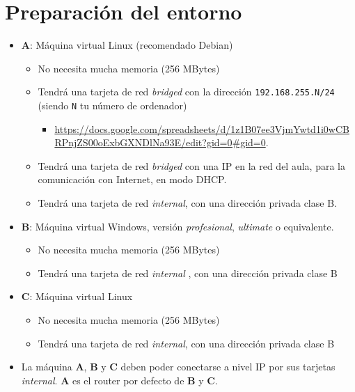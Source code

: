 \section{Preparación del entorno}
\begin{itemize}
\item  \textbf{A}: Máquina virtual Linux (recomendado Debian)
  \begin{itemize}
  \item No necesita mucha memoria (256 MBytes)
    
  \item Tendrá una tarjeta de red \textit{bridged} con la dirección \texttt{192.168.255.N/24} (siendo \texttt{N} tu número de ordenador)
    \begin{itemize}
    \item \url{https://docs.google.com/spreadsheets/d/1z1B07ee3VjmYwtd1i0wCBRPnjZS00oExbGXNDlNa93E/edit?gid=0#gid=0}.
    \end{itemize}
  \item Tendrá una tarjeta de red \textit{bridged} con una IP en la red del aula, para la comunicación con Internet, en modo DHCP.
  \item Tendrá una tarjeta de red \textit{internal}, con una dirección privada clase B.

  \end{itemize}



\item \textbf{B}: Máquina virtual Windows, versión \textit{profesional}, \textit{ultimate} o equivalente.
  \begin{itemize}
  \item  No necesita mucha memoria (256 MBytes)
  \item Tendrá una tarjeta de red \textit{internal} , con una dirección privada clase B
  \end{itemize}
\item \textbf{C}: Máquina virtual Linux
  \begin{itemize}
  \item No necesita mucha memoria (256 MBytes)
  \item Tendrá una tarjeta de red \textit{internal}, con una dirección privada clase B
  \end{itemize}
  
\item  La máquina \textbf{A}, \textbf{B} y \textbf{C} deben poder conectarse a nivel IP por sus tarjetas \textit{internal}. \textbf{A} es el router por defecto de \textbf{B} y \textbf{C}.
\end{itemize}



